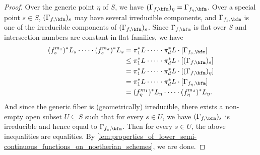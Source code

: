\begin{proof}
	Over the generic point $\eta$ of $S$, we have $(\Gamma_{f,\bfm})_\eta = \Gamma_{f_\eta,\bfm}$.
	Over a special point $s \in S$, $(\Gamma_{f,\bfm})_s$ may have several irreducible components, and $\Gamma_{f_s,\bfm}$ is one of the irreducible components of $(\Gamma_{f,\bfm})_s$.
	Since $\Gamma_{f,\bfm}$ is flat over $S$ and intersection numbers are constant in flat families, we have
	\begin{align*}
		(f_s^{m_1})^*L_s \cdot \cdots \cdot (f_s^{m_d})^*L_s & = \pi_1^*L \cdot \cdots \cdot \pi_d^*L \cdot [\Gamma_{f_s,\bfm}]      \\
		                                                     & \leq \pi_1^*L \cdot \cdots \cdot \pi_d^*L \cdot [(\Gamma_{f,\bfm})_s] \\
		                                                     & = \pi_1^*L \cdot \cdots \cdot \pi_d^*L \cdot [(\Gamma_{f,\bfm})_\eta] \\
		                                                     & = \pi_1^*L \cdot \cdots \cdot \pi_d^*L \cdot [\Gamma_{f_\eta,\bfm}]   \\
		                                                     & = (f_\eta^{m_1})^*L_\eta \cdot \cdots \cdot (f_\eta^{m_d})^*L_\eta.
	\end{align*}
	And since the generic fiber is (geometrically) irreducible, there exists a non-empty open subset $U \subseteq S$ such that for every $s \in U$, we have $(\Gamma_{f,\bfm})_s$ is irreducible and hence equal to $\Gamma_{f_s,\bfm}$.
	Then for every $s \in U$, the above inequalities are equalities.
	By \cref{lem:properties_of_lower_semi-continuous_functions_on_noetherian_schemes}, we are done.
\end{proof}

